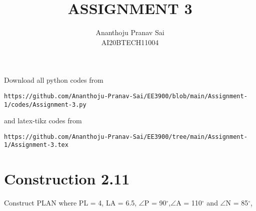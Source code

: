 \documentclass[journal,12pt,twocolumn]{IEEEtran}
\begin{document}
     \def\centbox#1{\makebox[0in]{#1}}
     \def\topbox#1{\raisebox{-\baselineskip}[0in][0in]{#1}}
     \def\midbox#1{\raisebox{-0.5\baselineskip}[0in][0in]{#1}}
\vspace{3cm}
\title{ASSIGNMENT 3}
\author{Ananthoju Pranav Sai \\ AI20BTECH11004}
\maketitle
\newpage
\bigskip
\renewcommand{\thefigure}{\theenumi}
\renewcommand{\thetable}{\theenumi}
Download all python codes from 
\begin{lstlisting}
https://github.com/Ananthoju-Pranav-Sai/EE3900/blob/main/Assignment-1/codes/Assignment-3.py
\end{lstlisting}
%
and latex-tikz codes from 
%
\begin{lstlisting}
https://github.com/Ananthoju-Pranav-Sai/EE3900/tree/main/Assignment-1/Assignment-3.tex
\end{lstlisting}
%
\section{Construction 2.11}
Construct PLAN where PL = 4, LA = 6.5, $\angle$P = 90$^\circ$,$\angle$A = 110$^\circ$ and $\angle$N = 85$^\circ$,
%
\end{document}
